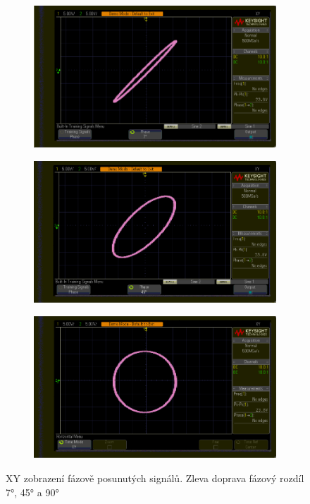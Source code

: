 \documentclass[twoside]{article}
\begin{document}
\begin{figure}[htbp]
	
	\begin{subfigure}{0.3\textwidth}
		\includegraphics[width=\linewidth]{xy_7deg.png}
	\end{subfigure}
	\begin{subfigure}{0.3\textwidth}
		\includegraphics[width=\linewidth]{xy_45deg.png}
	\end{subfigure}
	\begin{subfigure}{0.3\textwidth}
		\includegraphics[width=\linewidth]{xy_90deg.png}
	\end{subfigure}
	\caption{XY zobrazení fázově posunutých signálů. Zleva doprava fázový rozdíl 7°, 45° a 90°}
\end{figure}
\end{document}

